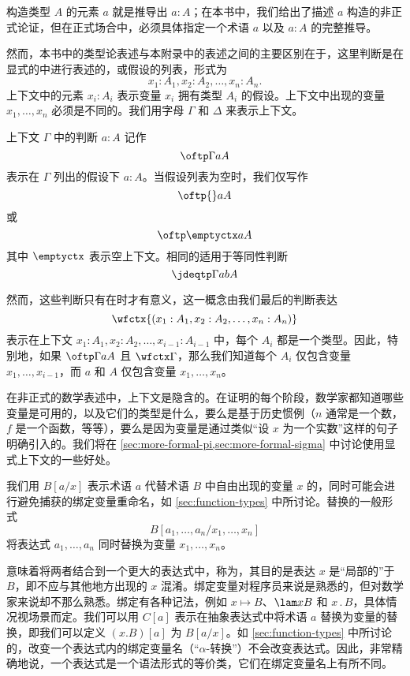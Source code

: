 构造类型 $A$ 的元素 $a$ 就是推导出 $a:A$；在本书中，我们给出了描述 $a$ 构造的非正式论证，但在正式场合中，必须具体指定一个术语 $a$ 以及 $a:A$ 的完整推导。

然而，本书中的类型论表述与本附录中的表述之间的主要区别在于，这里判断是在显式的中进行表述的，或假设的列表，形式为
\[
  x_1:A_1, x_2:A_2,\dots,x_n:A_n.
\]
上下文中的元素 $x_i : A_i$ 表示变量 $x_i$ 拥有类型 $A_i$ 的假设。上下文中出现的变量 $x_1, \ldots, x_n$ 必须是不同的。我们用字母 $\Gamma$ 和 $\Delta$ 来表示上下文。

上下文 $\Gamma$ 中的判断 $a:A$ 记作
\[ \oftp\Gamma aA \]
表示在 $\Gamma$ 列出的假设下 $a:A$。当假设列表为空时，我们仅写作
\[ \oftp{}aA \]
或
\[ \oftp\emptyctx aA \]
其中 $\emptyctx$ 表示空上下文。相同的适用于等同性判断
\[
  \jdeqtp\Gamma{a}{b}{A}
\]

然而，这些判断只有在时才有意义，这一概念由我们最后的判断表达
\[
  \wfctx{(x_1:A_1, x_2:A_2,\dots,x_n:A_n)}
\]
表示在上下文 $x_1:A_1, x_2:A_2,\dots,x_{i-1}:A_{i-1}$ 中，每个 $A_i$ 都是一个类型。因此，特别地，如果 $\oftp\Gamma aA$ 且 $\wfctx\Gamma$，那么我们知道每个 $A_i$ 仅包含变量 $x_1,\dots,x_{i-1}$，而 $a$ 和 $A$ 仅包含变量 $x_1,\dots,x_n$。

在非正式的数学表述中，上下文是隐含的。在证明的每个阶段，数学家都知道哪些变量是可用的，以及它们的类型是什么，要么是基于历史惯例（$n$ 通常是一个数，$f$ 是一个函数，等等），要么是因为变量是通过类似“设 $x$ 为一个实数”这样的句子明确引入的。我们将在 \cref{sec:more-formal-pi,sec:more-formal-sigma} 中讨论使用显式上下文的一些好处。

我们用 $B[a/x]$ 表示术语 $a$ 代替术语 $B$ 中自由出现的变量 $x$ 的，同时可能会进行避免捕获的绑定变量重命名，如 \cref{sec:function-types} 中所讨论。替换的一般形式
%
\[
  B[a_1,\dots,a_n/x_1,\dots,x_n]
\]
%
将表达式 $a_1,\dots,a_n$ 同时替换为变量 $x_1,\dots,x_n$。

意味着将两者结合到一个更大的表达式中，称为，其目的是表达 $x$ 是“局部的”于 $B$，即不应与其他地方出现的 $x$ 混淆。绑定变量对程序员来说是熟悉的，但对数学家来说却不那么熟悉。绑定有各种记法，例如 $x \mapsto B$、$\lam x B$ 和 $x \,.\, B$，具体情况视场景而定。我们可以用 $C[a]$ 表示在抽象表达式中将术语 $a$ 替换为变量的替换，即我们可以定义 $(x.B)[a]$ 为 $B[a/x]$。如 \cref{sec:function-types} 中所讨论的，改变一个表达式内的绑定变量名（“$\alpha$-转换”）不会改变表达式。因此，非常精确地说，一个表达式是一个语法形式的等价类，它们在绑定变量名上有所不同。

